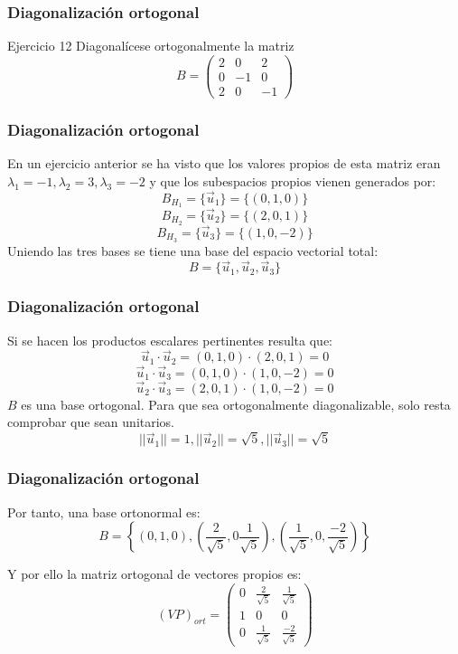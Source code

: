 \documentclass{beamer}
\begin{document}
\begin{frame}
\frametitle{Diagonalizaci\'on ortogonal}
\begin{block}{Ejercicio 12}
Diagonal\'icese ortogonalmente la matriz \[B=\left(\begin{array}{ccc}2 & 0 & 2 \\0 & -1 & 0 \\2 & 0 & -1\end{array}\right)\]
\end{block}
\end{frame}



\begin{frame}
\frametitle{Diagonalizaci\'on ortogonal}
En un ejercicio anterior se ha visto que los valores propios de esta matriz eran $\lambda_1 = -1, \lambda_2 = 3, \lambda_3 = -2$ y que los subespacios propios vienen generados por:
\[B_{H_1} = \{\vec u_1\} = \{(0,1,0)\}\]
\[B_{H_2} = \{\vec u_2\} = \{(2,0,1)\}\]
\[B_{H_3} = \{\vec u_3\} = \{(1,0,-2)\}\]
Uniendo las tres bases se tiene una base del espacio vectorial total:
\[B=\{\vec u_1, \vec u_2, \vec u_3\}\] 
\end{frame}


\begin{frame}
\frametitle{Diagonalizaci\'on ortogonal}
Si se hacen los productos escalares pertinentes resulta que:
\[\vec u_1 \cdot \vec u_2 = (0,1,0)\cdot (2,0,1) = 0\]
\[\vec u_1 \cdot \vec u_3 = (0,1,0)\cdot (1,0,-2) = 0\]
\[\vec u_2 \cdot \vec u_3 = (2,0,1)\cdot (1,0,-2) = 0\]
$B$ es una base ortogonal. Para que sea ortogonalmente diagonalizable, solo resta comprobar que sean unitarios. 
\[||\vec u_1|| = 1, ||\vec u_2|| = \sqrt{5}, ||\vec u_3|| = \sqrt{5}\]
\end{frame}

\begin{frame}
\frametitle{Diagonalizaci\'on ortogonal}
Por tanto, una base ortonormal es:
\[B=\left\{(0,1,0), \left(\frac{2}{\sqrt 5}, 0 \frac{1}{\sqrt 5}\right), \left(\frac{1}{\sqrt 5}, 0, \frac{-2}{\sqrt 5}\right)\right\}\]

Y por ello la matriz ortogonal de vectores propios es: 
\[(VP)_{ort} = \left(\begin{array}{ccc} 0 & \frac{2}{\sqrt 5} & \frac{1}{\sqrt 5} \\1 & 0 & 0 \\0 & \frac{1}{\sqrt 5} & \frac{-2}{\sqrt 5}\end{array}\right) \]

\end{frame}
\end{document}
